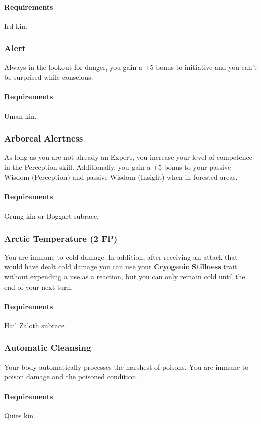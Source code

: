     \paragraph{Requirements} Ird kin.
\subsubsection{Alert} \label{feat::alert}
    Always in the lookout for danger, you gain a +5 bonus to initiative and you can't be surprised while conscious.
    \paragraph{Requirements} Uman kin.
\subsubsection{Arboreal Alertness} \label{feat::arborealalertness}
    As long as you are not already an Expert, you increase your level of competence in the Perception skill.
    Additionally, you gain a +5 bonus to your passive Wisdom (Perception) and passive Wisdom (Insight) when in forested areas.
    \paragraph{Requirements} Grung kin or Boggart subrace.
\subsubsection{Arctic Temperature (2 FP)} \label{feat::arctictemperature}
    You are immune to cold damage.
    In addition, after receiving an attack that would have dealt cold damage you can use your \textbf{Cryogenic Stillness} trait without expending a use as a reaction, but you can only remain cold until the end of your next turn.
    \paragraph{Requirements} Hail Zaloth subrace.
\subsubsection{Automatic Cleansing} \label{feat::automaticcleansing}
    Your body automatically processes the harshest of poisons.
    You are immune to poison damage and the poisoned condition.
    \paragraph{Requirements} Quies kin.
